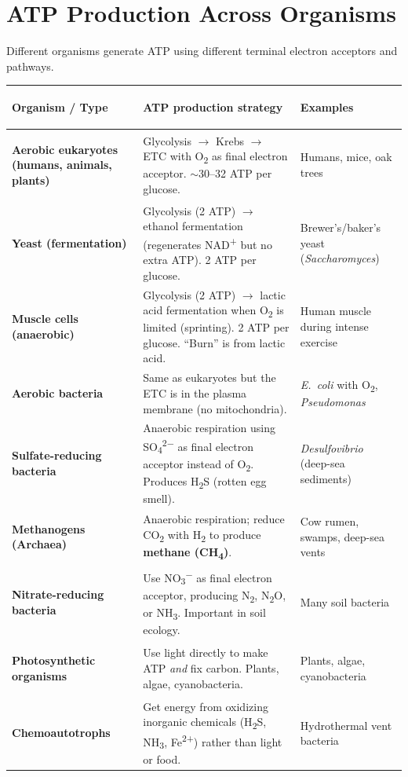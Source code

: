 \documentclass[11pt, letterpaper]{article}
\begin{document}
\section*{ATP Production Across Organisms}

Different organisms generate ATP using different terminal electron acceptors and pathways.

\noindent
{\small\renewcommand{\arraystretch}{1.6}
\begin{tabularx}{\textwidth}{>{\bfseries\raggedright\arraybackslash}p{2.8cm}
                              >{\raggedright\arraybackslash}X
                              >{\raggedright\arraybackslash}p{3.5cm}}
\toprule
\rowcolor{tableheaderteal}
\textbf{Organism / Type} & \textbf{ATP production strategy} & \textbf{Examples} \\
\midrule
\rowcolor{rowTe} \textbf{Aerobic eukaryotes (humans, animals, plants)} & Glycolysis $\to$ Krebs $\to$ ETC with O\textsubscript{2} as final electron acceptor. $\sim$30--32 ATP per glucose. & Humans, mice, oak trees \\
\rowcolor{rowA}  \textbf{Yeast (fermentation)} & Glycolysis (2 ATP) $\to$ ethanol fermentation (regenerates NAD\textsuperscript{+} but no extra ATP). 2 ATP per glucose. & Brewer's/baker's yeast (\textit{Saccharomyces}) \\
\rowcolor{rowTe} \textbf{Muscle cells (anaerobic)} & Glycolysis (2 ATP) $\to$ lactic acid fermentation when O\textsubscript{2} is limited (sprinting). 2 ATP per glucose. ``Burn'' is from lactic acid. & Human muscle during intense exercise \\
\rowcolor{rowA}  \textbf{Aerobic bacteria} & Same as eukaryotes but the ETC is in the plasma membrane (no mitochondria). & \textit{E.\ coli} with O\textsubscript{2}, \textit{Pseudomonas} \\
\rowcolor{rowTe} \textbf{Sulfate-reducing bacteria} & Anaerobic respiration using SO\textsubscript{4}\textsuperscript{2$-$} as final electron acceptor instead of O\textsubscript{2}. Produces H\textsubscript{2}S (rotten egg smell). & \textit{Desulfovibrio} (deep-sea sediments) \\
\rowcolor{rowA}  \textbf{Methanogens (Archaea)} & Anaerobic respiration; reduce CO\textsubscript{2} with H\textsubscript{2} to produce \textbf{methane (CH\textsubscript{4})}. & Cow rumen, swamps, deep-sea vents \\
\rowcolor{rowTe} \textbf{Nitrate-reducing bacteria} & Use NO\textsubscript{3}\textsuperscript{$-$} as final electron acceptor, producing N\textsubscript{2}, N\textsubscript{2}O, or NH\textsubscript{3}. Important in soil ecology. & Many soil bacteria \\
\rowcolor{rowA}  \textbf{Photosynthetic organisms} & Use light directly to make ATP \emph{and} fix carbon. Plants, algae, cyanobacteria. & Plants, algae, cyanobacteria \\
\rowcolor{rowTe} \textbf{Chemoautotrophs} & Get energy from oxidizing inorganic chemicals (H\textsubscript{2}S, NH\textsubscript{3}, Fe\textsuperscript{2+}) rather than light or food. & Hydrothermal vent bacteria \\
\bottomrule
\end{tabularx}}
\end{document}
